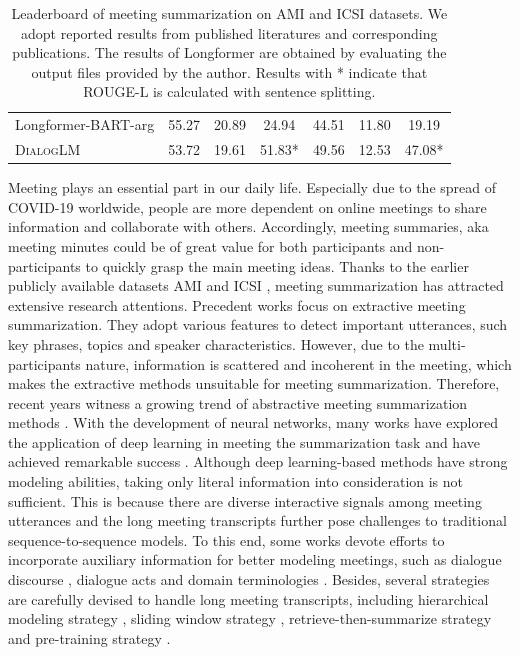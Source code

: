 \begin{table}[t]
\begin{tabular}{l||ccc||ccc}
            Longformer-BART-arg  & 55.27 & 20.89 & 24.94 & 44.51 & 11.80 & 19.19 \\
            \textsc{Dialog}LM  & 53.72  & 19.61  & 51.83* & 49.56  & 12.53  & 47.08* \\
            \hline
        \end{tabular}
\caption{Leaderboard of meeting summarization on AMI \protect and ICSI \protect datasets. We adopt reported results from published literatures \protect and corresponding publications. The results of Longformer \protect are obtained by evaluating the output files provided by the author. Results with *
indicate that ROUGE-L is calculated with sentence splitting.} \label{tab:ami_bench}
\end{table}

\label{sec:meeting}
Meeting plays an essential part in our daily life. 
Especially due to the spread of COVID-19 worldwide, people are more dependent on online meetings to share information and collaborate with others.
Accordingly, meeting summaries, aka meeting minutes could be of great value for both participants and non-participants to quickly grasp the main meeting ideas. 
Thanks to the earlier publicly available datasets AMI  and ICSI , meeting summarization has attracted extensive research attentions. 
Precedent works focus on extractive meeting summarization. They adopt various features to detect important utterances, such key phrases, topics and speaker characteristics.
However, due to the multi-participants nature, information is scattered and incoherent in the meeting, which makes the extractive methods unsuitable for meeting summarization. 
Therefore, recent years witness a growing trend of abstractive meeting summarization methods .
With the development of neural networks, many works have explored the application of deep learning in meeting the summarization task and have achieved remarkable success .
Although deep learning-based methods have strong modeling abilities, taking only literal information into consideration is not sufficient. 
This is because there are diverse interactive signals among meeting utterances and the long meeting transcripts further pose challenges to traditional sequence-to-sequence models.
To this end, some works devote efforts to incorporate auxiliary information for better modeling meetings, such as dialogue discourse , dialogue acts  and domain terminologies .
Besides, several strategies are carefully devised to handle long meeting transcripts, including hierarchical modeling strategy , sliding window strategy , retrieve-then-summarize strategy  and pre-training strategy .
